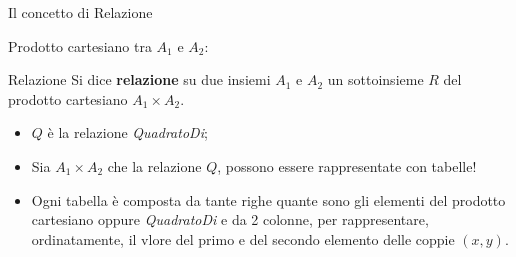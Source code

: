 \begin{frame}{Il concetto di Relazione}
\begin{minipage}[t]{0.4\linewidth}
Prodotto cartesiano tra $A_1$ e $A_2$:
\begin{center}
\cartesianproductRedQ
\end{center}
\end{minipage}%
\hfill%
\begin{minipage}[t]{0.6\linewidth}
\begin{block}{Relazione}
Si dice \textbf{relazione} su due insiemi $A_1$ e $A_2$ un sottoinsieme $R$ del prodotto cartesiano $A_1 \times A_2$.
\end{block}
\pause
\begin{itemize}[<+->]
    \item $Q$ \`e la relazione \textit{QuadratoDi};
    \item Sia $A_1 \times A_2$ che la relazione $Q$, possono essere rappresentate con tabelle!
    \item Ogni tabella \`e composta da tante righe quante sono gli elementi del prodotto cartesiano oppure \textit{QuadratoDi} e da 2 colonne, per rappresentare, ordinatamente, il vlore del primo e del secondo elemento delle coppie $(x,y)$.
\end{itemize}
\end{minipage}
\end{frame}
%
